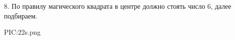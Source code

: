 8. По правилу магического квадрата в центре должно стоять число 6, далее подбираем.
\begin{center}
{{PIC:22s.png}}
\end{center}
